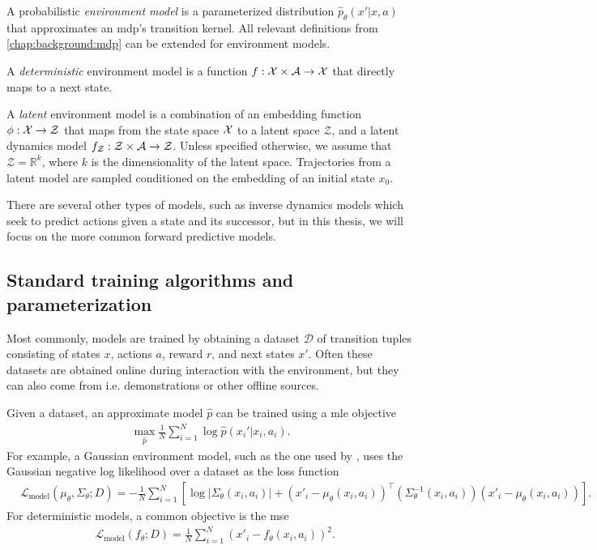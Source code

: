 \begin{definition}
    A probabilistic \emph{environment model} is a parameterized distribution $\hat{p}_\theta(x'|x,a)$ that approximates an \ac{mdp}'s transition kernel.
    All relevant definitions from \autoref{chap:background:mdp} can be extended for environment models.
    
    A \emph{deterministic} environment model is a function $f: \mathcal{X} \times \mathcal{A} \rightarrow \mathcal{X}$ that directly maps to a next state.

    A \emph{latent} environment model is a combination of an embedding function $\phi: \mathcal{X} \rightarrow \mathcal{Z}$ that maps from the state space $\mathcal{X}$ to a latent space $\mathcal{Z}$, and a latent dynamics model $f_\mathcal{Z}: \mathcal{Z} \times \mathcal{A} \rightarrow \mathcal{Z}$.
    Unless specified otherwise, we assume that $\mathcal{Z} = \mathbb{R}^k$, where $k$ is the dimensionality of the latent space.
    Trajectories from a latent model are sampled conditioned on the embedding of an initial state $x_0$.
\end{definition}


There are several other types of models, such as inverse dynamics models which seek to predict actions given a state and its successor, but in this thesis, we will focus on the more common forward predictive models.

\subsection{Standard training algorithms and parameterization}

Most commonly, models are trained by obtaining a dataset $\mathcal{D}$ of transition tuples consisting of states $x$, actions $a$, reward $r$, and next states $x'$. 
Often these datasets are obtained online during interaction with the environment, but they can also come from i.e. demonstrations or other offline sources.

Given a dataset, an approximate model $\hat{p}$ can be trained using a \ac{mle} objective 
\begin{align}
\max_{\hat{p}} \frac{1}{N}\sum_{i=1}^N \log \hat{p}(x_i'|x_i,a_i).
\end{align}
For example, a Gaussian environment model, such as the one used by \textcite{pets,mbpo,vagram}, uses the Gaussian negative log likelihood over a dataset as the loss function
\begin{align}
    &\mathcal{L}_\mathrm{model}(\mu_\theta, \Sigma_\theta; D) = - \frac{1}{N} \sum_{i=1}^N \left[\log |\Sigma_\theta(x_i, a_i)| + (x'_i - \mu_\theta(x_i, a_i))^\top \left(\Sigma^{-1}_\theta(x_i, a_i) \right) (x'_i - \mu_\theta(x_i, a_i)) \right].
\end{align}
For deterministic models, a common objective is the \ac{mse}
\begin{align}
    &\mathcal{L}_\mathrm{model}(f_\theta; D) = \frac{1}{N} \sum_{i=1}^N (x'_i - f_\theta(x_i, a_i))^2.
\end{align}

